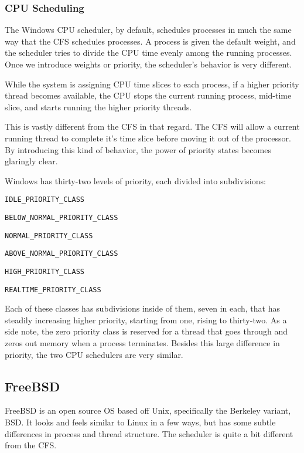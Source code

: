 \documentclass[10pt,letterpaper,onecolumn,draftclsnofoot]{IEEEtran}
\begin{document}
%

\subsubsection{CPU Scheduling}
The Windows CPU scheduler, by default, schedules processes in much the same way
that the CFS schedules processes. A process is given the default weight, and
the scheduler tries to divide the CPU time evenly among the running processes.
Once we introduce weights or priority, the scheduler's behavior is very different.

While the system is assigning CPU time slices to each process, if a higher priority
thread becomes available, the CPU stops the current running process, mid-time
slice, and starts running the higher priority threads.

This is vastly different from the CFS in that regard. The CFS will allow a current
running thread to complete it's time slice before moving it out of the processor.
By introducing this kind of behavior, the power of priority states becomes glaringly
clear.

Windows has thirty-two levels of priority, each divided into subdivisions:
\begin{description}
	\item \texttt{IDLE\_PRIORITY\_CLASS}
	\item \texttt{BELOW\_NORMAL\_PRIORITY\_CLASS}
	\item \texttt{NORMAL\_PRIORITY\_CLASS}
	\item \texttt{ABOVE\_NORMAL\_PRIORITY\_CLASS}
	\item \texttt{HIGH\_PRIORITY\_CLASS}
	\item \texttt{REALTIME\_PRIORITY\_CLASS}
\end{description}

Each of these classes has subdivisions inside of them, seven in each, that
has steadily increasing higher priority, starting from one, rising to thirty-two.
As a side note, the zero priority class is reserved for a thread that goes through
and zeros out memory when a process terminates.\cite{msschedule2016} Besides
this large difference in priority, the two CPU schedulers are very similar.

\subsection{FreeBSD}
FreeBSD is an open source OS based off Unix, specifically the Berkeley variant,
BSD. It looks and feels similar to Linux in a few ways, but has some subtle
differences in process and thread structure. The scheduler is quite a bit different
from the CFS.
\end{document}
